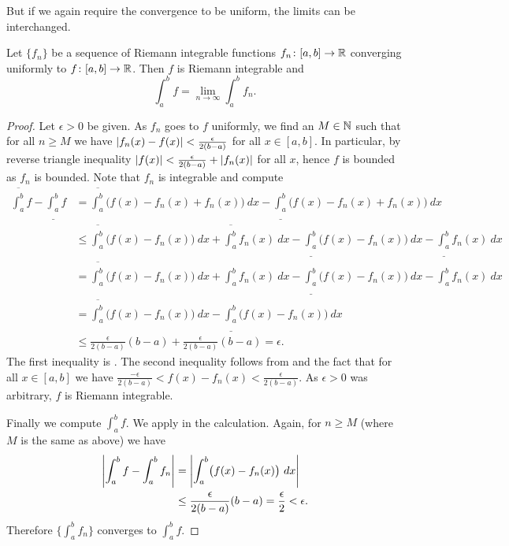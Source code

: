 But
if we again require the convergence to be uniform, the limits can
be interchanged.

\begin{thm} \label{integralinterchange:thm}
Let $\{ f_n \}$ be a sequence of Riemann integrable
functions
$f_n \colon [a,b] \to {\mathbb{R}}$
converging uniformly to $f \colon [a,b]
\to {\mathbb{R}}$.  Then $f$ is Riemann integrable and
\begin{equation*}
\int_a^b f = \lim_{n\to\infty} \int_a^b f_n .
\end{equation*}
\end{thm}

\begin{proof}
Let $\epsilon > 0$ be given.
As $f_n$ goes to $f$ uniformly, we find an $M \in {\mathbb{N}}$ such that
for all $n \geq M$ we have 
$\left\lvert {f_n(x)-f(x)} \right\rvert < \frac{\epsilon}{2(b-a)}$ for all $x \in [a,b]$.
In particular, by reverse triangle inequality
$\left\lvert {f(x)} \right\rvert < \frac{\epsilon}{2(b-a)} + \left\lvert {f_n(x)} \right\rvert$ for all $x$,
hence $f$ is bounded
as $f_n$ is bounded.
Note that $f_n$ is integrable and compute
\begin{equation*}
\begin{split}
\overline{\int_a^b} f
-
\underline{\int_a^b} f
& =
\overline{\int_a^b} \bigl( f(x) - f_n(x) + f_n(x) \bigr)~dx
-
\underline{\int_a^b} \bigl( f(x) - f_n(x) + f_n(x) \bigr)~dx
\\
& \leq
\overline{\int_a^b} \bigl( f(x) - f_n(x) \bigr)~dx +  \overline{\int_a^b} f_n(x) ~dx
-
\underline{\int_a^b} \bigl( f(x) - f_n(x) \bigr)~dx -  \underline{\int_a^b} f_n(x) ~dx
\\
& =
\overline{\int_a^b} \bigl( f(x) - f_n(x) \bigr)~dx +  \int_a^b f_n(x) ~dx
-
\underline{\int_a^b} \bigl( f(x) - f_n(x) \bigr)~dx -  \int_a^b f_n(x) ~dx
\\
& =
\overline{\int_a^b} \bigl( f(x) - f_n(x) \bigr)~dx
-
\underline{\int_a^b} \bigl( f(x) - f_n(x) \bigr)~dx
\\
& \leq
\frac{\epsilon}{2(b-a)} (b-a) + 
\frac{\epsilon}{2(b-a)} (b-a) = \epsilon .
\end{split}
\end{equation*}
The first inequality is .
The second inequality follows from  and 
the fact that for all $x \in [a,b]$ we have
$\frac{-\epsilon}{2(b-a)} < f(x)-f_n(x) < \frac{\epsilon}{2(b-a)}$.
As $\epsilon > 0$ was arbitrary, $f$ is Riemann integrable.

Finally we compute $\int_a^b f$.  We apply 
in the calculation.  Again, for $n \geq M$ (where $M$ is the same as above) we have
\begin{equation*}
\begin{split}
\left\lvert {\int_a^b f - \int_a^b f_n} \right\rvert & = 
\left\lvert { \int_a^b \bigl(f(x) - f_n(x)\bigr)~dx} \right\rvert
\\
& \leq
\frac{\epsilon}{2(b-a)} (b-a) = \frac{\epsilon}{2} < \epsilon .
\end{split}
\end{equation*}
Therefore $\{ \int_a^b f_n \}$ converges to $\int_a^b f$.
\end{proof}

